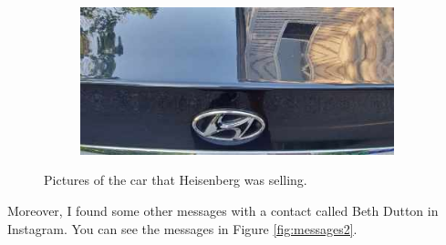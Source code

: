 \documentclass[12pt]{article}
\begin{document}
\begin{figure}[!ht]
\begin{subfigure}[b]{0.3\textwidth}
        \caption{}
    \end{subfigure} \\
    \vspace{3 pt}
    \begin{subfigure}[b]{0.6\textwidth}
        \centering
        \includegraphics[width=\textwidth]{images/car3.png}
        \caption{}
    \end{subfigure}
    \caption{Pictures of the car that Heisenberg was selling.}
    \label{fig:cars}
\end{figure}

Moreover, I found some other messages with a contact called Beth Dutton in Instagram. You can see the messages in Figure \ref{fig:messages2}.
\end{document}
